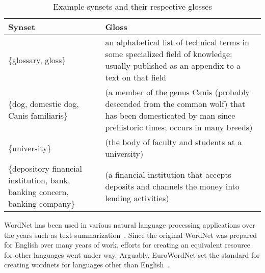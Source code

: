 \begin{table}[htbp]
    \centering
    \begin{tabulary}{\textwidth}{LL}
        \toprule%
        \textbf{Synset} & \textbf{Gloss} \\
        \midrule%
        \{glossary, gloss\} & an alphabetical list of technical terms in some specialized field of knowledge; usually published as an appendix to a text on that field \\
        \cmidrule(rl){1-2}
        \{dog, domestic dog, Canis familiaris\} & (a member of the genus Canis (probably descended from the common wolf) that has been domesticated by man since prehistoric times; occurs in many breeds) \\
        \cmidrule(rl){1-2}
        \{university\} & (the body of faculty and students at a university) \\
        \cmidrule(rl){1-2}
        \{depository financial institution, bank, banking concern, banking company\} & (a financial institution that accepts deposits and channels the money into lending activities) \\
        \bottomrule %
    \end{tabulary}
    \caption{Example synsets and their respective glosses}%
    \label{tab:synset_gloss}%
\end{table}

WordNet has been used in various natural language processing applications over the years such as text summarization~\cite{ercan_using_2007}.
Since the original WordNet was prepared for English over many years of work, efforts for creating an equivalent resource for other languages went under way.
Arguably, EuroWordNet set the standard for creating wordnets for languages other than English~\cite{vossen_introduction_1998, vossen_eurowordnet_2004}.

